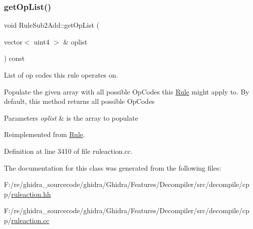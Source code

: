 \subsubsection{\texorpdfstring{getOpList()}{getOpList()}}
{\footnotesize\ttfamily void Rule\+Sub2\+Add\+::get\+Op\+List (\begin{DoxyParamCaption}\item[{vector$<$ uint4 $>$ \&}]{oplist }\end{DoxyParamCaption}) const\hspace{0.3cm}{\ttfamily [virtual]}}



List of op codes this rule operates on. 

Populate the given array with all possible Op\+Codes this \mbox{\hyperlink{class_rule}{Rule}} might apply to. By default, this method returns all possible Op\+Codes 
\begin{DoxyParams}{Parameters}
{\em oplist} & is the array to populate \\
\hline
\end{DoxyParams}


Reimplemented from \mbox{\hyperlink{class_rule_a4023bfc7825de0ab866790551856d10e}{Rule}}.



Definition at line 3410 of file ruleaction.\+cc.



The documentation for this class was generated from the following files\+:\begin{DoxyCompactItemize}
\item 
F\+:/re/ghidra\+\_\+sourcecode/ghidra/\+Ghidra/\+Features/\+Decompiler/src/decompile/cpp/\mbox{\hyperlink{ruleaction_8hh}{ruleaction.\+hh}}\item 
F\+:/re/ghidra\+\_\+sourcecode/ghidra/\+Ghidra/\+Features/\+Decompiler/src/decompile/cpp/\mbox{\hyperlink{ruleaction_8cc}{ruleaction.\+cc}}\end{DoxyCompactItemize}
